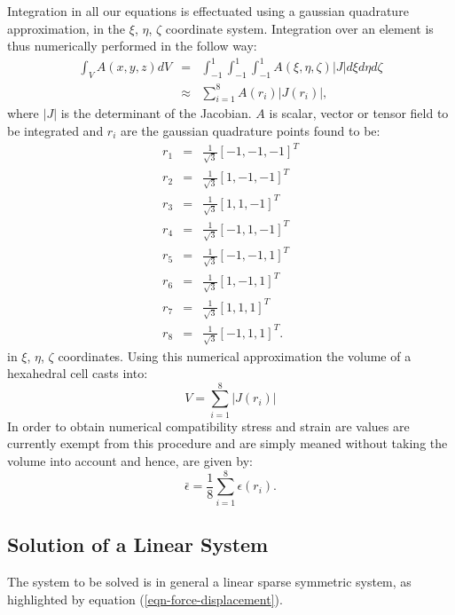 Integration in all our equations is effectuated using a gaussian
quadrature approximation, in the $\xi$, $\eta$, $\zeta$ coordinate
system. Integration over an element is thus numerically performed in the
follow way: 
\begin{eqnarray}
  \int_V A(x,y,z) dV &=& \int_{-1}^{1}\int_{-1}^{1}\int_{-1}^{1} A(\xi,\eta,\zeta)
  |J| d\xi d\eta d\zeta \nonumber \\
  &\approx& \sum_{i=1}^8 A(r_i) |J(r_i)|,
\end{eqnarray}
where $|J|$ is the determinant of the Jacobian. $A$ is scalar, vector
or tensor field to be integrated and $r_i$ are the gaussian quadrature
points found to be:
\begin{eqnarray}
  r_1&=& \frac{1}{\sqrt{3}}[-1,-1,-1]^T \nonumber \\
  r_2&=& \frac{1}{\sqrt{3}}[1,-1,-1]^T \nonumber \\
  r_3&=& \frac{1}{\sqrt{3}}[1,1,-1]^T \nonumber \\
  r_4&=& \frac{1}{\sqrt{3}}[-1,1,-1]^T \nonumber \\
  r_5&=& \frac{1}{\sqrt{3}}[-1,-1,1]^T \nonumber \\
  r_6&=& \frac{1}{\sqrt{3}}[1,-1,1]^T \nonumber \\
  r_7&=& \frac{1}{\sqrt{3}}[1,1,1]^T \nonumber \\
  r_8&=& \frac{1}{\sqrt{3}}[-1,1,1]^T.
\end{eqnarray}
in $\xi$, $\eta$, $\zeta$ coordinates. Using this numerical approximation
the volume of a hexahedral cell casts into:
\begin{equation}
  V = \sum_{i=1}^8 |J(r_i)|
\end{equation}
In order to obtain numerical compatibility stress and strain are
values are currently exempt from this procedure and are simply
meaned without taking the volume into account and hence, are given by:
\begin{equation}
  \bar{\epsilon} = \frac{1}{8}\sum_{i=1}^8\epsilon(r_i).
\end{equation}

\subsection{Solution of a Linear System}

The system to be solved is in general a linear sparse symmetric
system, as highlighted by equation (\ref{eqn-force-displacement}).

